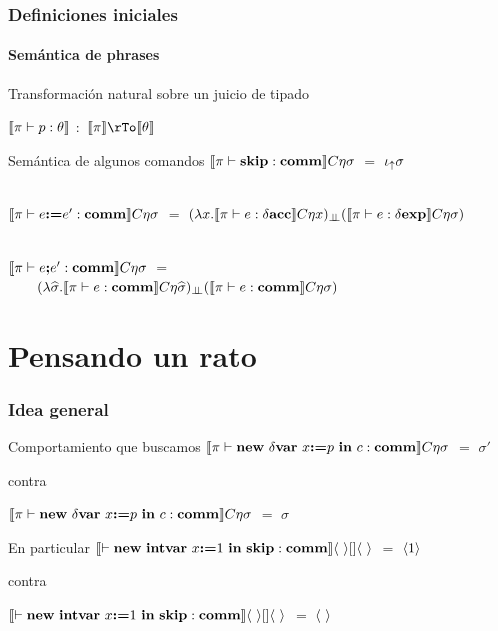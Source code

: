 \documentclass{beamer} %
\begin{document}
\begin{frame}
\frametitle{Definiciones iniciales}
\framesubtitle{Sem\'antica de phrases}

\begin{block}{Transformaci\'on natural sobre un juicio de tipado}

$\llbracket \pi \vdash p : \theta \rrbracket$ $:$ $\semBrcks{\pi} \rTo \semBrcks{\theta}$

\end{block}

\begin{block}{Sem\'antica de algunos comandos}\small
$\llbracket  \pi \vdash \textbf{skip} : \textbf{comm}  \rrbracket C\eta\sigma$ 
$=$ $\iota_{\uparrow} \sigma$\\
\
			
$\llbracket  \pi \vdash e \textbf{:=} e' : \textbf{comm}  \rrbracket C\eta\sigma$ 
$=$ $(\lambda x . \llbracket \pi \vdash e : \delta \textbf{acc} \rrbracket C\eta x)_{\bot \!\!\! \bot}
(\llbracket  \pi \vdash e : \delta \textbf{exp}  \rrbracket C\eta\sigma)$\\
\

$\llbracket  \pi \vdash e \textbf{;} e' : \textbf{comm}  \rrbracket C\eta\sigma$ 
$=$ \\
\ \ \ \ $(\lambda \widehat{\sigma} . \llbracket \pi \vdash e : \textbf{comm} \rrbracket C\eta\widehat{\sigma})_{\bot \!\!\! \bot}
(\llbracket  \pi \vdash e : \textbf{comm} \rrbracket C\eta\sigma)$\\
\end{block}

\end{frame}

\section{Pensando un rato}

\begin{frame}
\frametitle{Idea general}

\begin{block}{Comportamiento que buscamos}
$\llbracket \pi \vdash \textbf{new} \ \delta \textbf{var} \ x \textbf{:=} p \ \textbf{in} \ c : \textbf{comm} \rrbracket C\eta\sigma$ $=$ $\sigma'$

contra

$\llbracket \pi \vdash \textbf{new} \ \delta \textbf{var} \ x \textbf{:=} p \ \textbf{in} \ c : \textbf{comm} \rrbracket C\eta\sigma$ $=$ $\sigma$
\end{block}

\begin{block}{En particular}
$\semBrcks{ \vdash \newvar{\intvar}{x}{1}{\cskip} : \commt}\lrangles{\ }[]\lrangles{\ }$ $=$ $\langle 1 \rangle$

contra

$\semBrcks{ \vdash \newvar{\intvar}{x}{1}{\cskip} : \commt}\lrangles{\ }[]\lrangles{\ }$ $=$ $\langle \  \rangle$
\end{block}
\end{frame}
\end{document}
